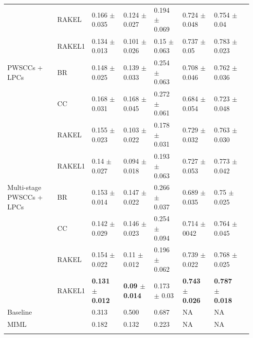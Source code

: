 \begin{table}[htb!]
{\begin{tabular}{llllllll}
                          & RAKEL           & 0.166 $\pm$ 0.035           & 0.124 $\pm$ 0.027         & 0.194 $\pm$ 0.069        & 0.724 $\pm$ 0.048                & 0.754 $\pm$ 0.04        \\ 
                          & RAKEL1           & 0.134 $\pm$ 0.013           & 0.101 $\pm$ 0.026        & 0.15 $\pm$ 0.063         & 0.737 $\pm$ 0.05                 & 0.783 $\pm$ 0.023       \\ 
PWSCCs + LPCs             & BR              & 0.148 $\pm$ 0.025           & 0.139 $\pm$ 0.033      & 0.254 $\pm$ 0.063        & 0.708 $\pm$ 0.046                & 0.762 $\pm$ 0.036       \\ 
                          & CC              & 0.168 $\pm$ 0.031           & 0.168 $\pm$ 0.045        & 0.272 $\pm$ 0.061        & 0.684 $\pm$ 0.054                & 0.723 $\pm$ 0.048       \\ 
                          & RAKEL           & 0.155 $\pm$ 0.023           & 0.103 $\pm$ 0.022        & 0.178 $\pm$ 0.031        & 0.729 $\pm$ 0.032                & 0.763 $\pm$ 0.030       \\ 
                          & RAKEL1           & 0.14 $\pm$ 0.027            & 0.094 $\pm$ 0.018         & 0.193 $\pm$ 0.063        & 0.727 $\pm$ 0.053                & 0.773 $\pm$ 0.042       \\ 
Multi-stage PWSCCs + LPCs & BR              & 0.153 $\pm$ 0.014           & 0.147 $\pm$ 0.022      & 0.266 $\pm$ 0.037        & 0.689 $\pm$ 0.035                & 0.75 $\pm$ 0.025        \\ 
                          & CC              & 0.142 $\pm$ 0.029           & 0.146 $\pm$ 0.023        & 0.254 $\pm$ 0.094        & 0.714 $\pm$ 0042                 & 0.764 $\pm$ 0.045       \\ 
                          & RAKEL           & 0.154 $\pm$ 0.022           & 0.11 $\pm$ 0.012         & 0.196 $\pm$ 0.062        & 0.739 $\pm$ 0.022                & 0.768 $\pm$ 0.025       \\ 
                          & RAKEL1           & \textbf{0.131 $\pm$ 0.012          } & \textbf{0.09 $\pm$ 0.014}                       & 0.173 $\pm$ 0.03         & \textbf{0.743 $\pm$ 0.026}               & \textbf{0.787 $\pm$ 0.018}      
\\ \hline
Baseline &               & 0.313           & 0.500      & 0.687        & NA                & NA
\\ \hline
MIML & &    0.182           & 0.132      & 0.223        & NA                & NA                        
                          
                          
                           \\ \hhline{========}
\end{tabular}
}
\end{table}




